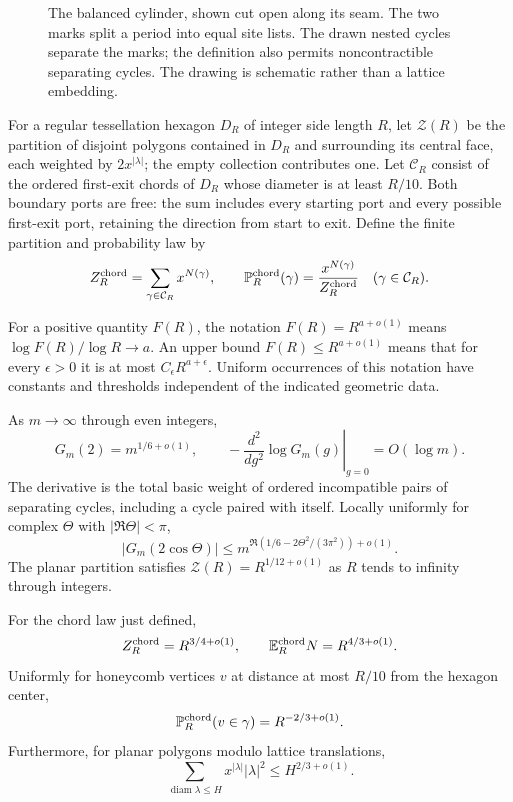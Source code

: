 \begin{figure}[ht]
\centering

\caption{The balanced cylinder, shown cut open along its seam. The two
marks split a period into equal site lists. The drawn nested cycles
separate the marks; the definition also permits noncontractible
separating cycles. The drawing is schematic rather than a lattice
embedding.}\label{j:fig-cylinder}
\end{figure}

For a regular tessellation hexagon $D_R$ of integer side length $R$, let
$\mathcal Z(R)$ be the partition of disjoint polygons contained in $D_R$
and surrounding its central face, each weighted by $2x^{|\lambda|}$;
the empty collection contributes one. Let $\mathcal C_R$ consist of
the ordered first-exit chords of $D_R$ whose diameter is at least $R/10$.
Both boundary ports are free: the sum includes every starting port and
every possible first-exit port, retaining the direction from start to
exit. Define the finite partition and probability law by
\[
 Z_R^{\rm chord}=\sum_{\gamma\in\mathcal C_R}x^{N(\gamma)},\qquad
 \mathbb P_R^{\rm chord}(\gamma)
   =\frac{x^{N(\gamma)}}{Z_R^{\rm chord}}\quad(\gamma\in\mathcal C_R).
\]

For a positive quantity $F(R)$, the notation $F(R)=R^{a+o(1)}$ means
$\log F(R)/\log R\to a$. An upper bound $F(R)\le R^{a+o(1)}$ means
that for every $\epsilon>0$ it is at most $C_\epsilon R^{a+\epsilon}$.
Uniform occurrences of this notation have constants and thresholds
independent of the indicated geometric data.

\begin{theorem}\label{j:cylinder}
As $m\to\infty$ through even integers,
\[
 G_m(2)=m^{1/6+o(1)},\qquad
 -\left.\frac{d^2}{dg^2}\log G_m(g)\right|_{g=0}=O(\log m).
\]
The derivative is the total basic weight of ordered incompatible pairs
of separating cycles, including a cycle paired with itself. Locally
uniformly for complex $\Theta$ with $|\Re\Theta|<\pi$,
\[
 |G_m(2\cos\Theta)|
 \le m^{\Re(1/6-2\Theta^2/(3\pi^2))+o(1)}.
\]
The planar partition satisfies $\mathcal Z(R)=R^{1/12+o(1)}$ as $R$ tends
to infinity through integers.
\end{theorem}

\begin{theorem}\label{j:hexagon}
For the chord law just defined,
\[
 Z_R^{\rm chord}=R^{3/4+o(1)},\qquad
 \mathbb E_R^{\rm chord}N=R^{4/3+o(1)}.
\]
Uniformly for honeycomb vertices $v$ at distance at most $R/10$ from the
hexagon center,
\[
 \mathbb P_R^{\rm chord}(v\in\gamma)=R^{-2/3+o(1)}.
\]
Furthermore, for planar polygons modulo lattice translations,
\begin{equation}\label{j:polygon-square}
 \sum_{\operatorname{diam}\lambda\le H}
      x^{|\lambda|}|\lambda|^2\le H^{2/3+o(1)}.
\end{equation}
\end{theorem}

